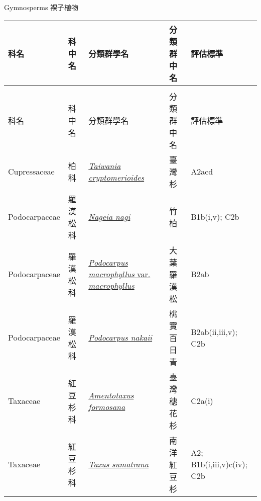 \noindent\normalfont\selectfont Gymnosperms 裸子植物
\footnotesize\selectfont
        {\def\arraystretch{1.5}\tabcolsep=2pt
        \begin{longtable}{p{2.5cm}p{2.5cm}p{4.5cm}p{2.5cm}p{3cm}}
        \toprule
          科名 & 科中名 & 分類群學名 & 分類群中名 & 評估標準 \\
        \midrule 
        \endfirsthead

        \multicolumn{4}{l}{\bfseries\Large\color{red}{國家瀕危 (NEN) 類別維管束植物名錄(續)}} \\
        \toprule
        科名 & 科中名 & 分類群學名 & 分類群中名 & 評估標準 \\
        \midrule
        \endhead
                Cupressaceae & 柏科 & \href{http://www.theplantlist.org/tpl1.1/search?q=Taiwania+cryptomerioides}{\textit{Taiwania cryptomerioides} } & 臺灣杉 & A2acd \index{Taiwania@\textit{Taiwania}!cryptomerioides@\textit{cryptomerioides}}  \index{臺灣杉} \\
    Podocarpaceae & 羅漢松科 & \href{http://www.theplantlist.org/tpl1.1/search?q=Nageia+nagi}{\textit{Nageia nagi} } & 竹柏 & B1b(i,v); C2b \index{Nageia@\textit{Nageia}!nagi@\textit{nagi}}  \index{竹柏} \\
    Podocarpaceae & 羅漢松科 & \href{http://www.theplantlist.org/tpl1.1/search?q=Podocarpus+macrophyllus+var.+macrophyllus}{\textit{Podocarpus macrophyllus} var. \textit{macrophyllus} } & 大葉羅漢松 & B2ab \index{Podocarpus@\textit{Podocarpus}!macrophyllus@\textit{macrophyllus}!var. macrophyllus@var. \textit{macrophyllus}}  \index{大葉羅漢松} \\
    Podocarpaceae & 羅漢松科 & \href{http://www.theplantlist.org/tpl1.1/search?q=Podocarpus+nakaii}{\textit{Podocarpus nakaii} } & 桃實百日青 & B2ab(ii,iii,v); C2b \index{Podocarpus@\textit{Podocarpus}!nakaii@\textit{nakaii}}  \index{桃實百日青} \\
    Taxaceae & 紅豆杉科 & \href{http://www.theplantlist.org/tpl1.1/search?q=Amentotaxus+formosana}{\textit{Amentotaxus formosana} } & 臺灣穗花杉 & C2a(i) \index{Amentotaxus@\textit{Amentotaxus}!formosana@\textit{formosana}}  \index{臺灣穗花杉} \\
    Taxaceae & 紅豆杉科 & \href{http://www.theplantlist.org/tpl1.1/search?q=Taxus+sumatrana}{\textit{Taxus sumatrana} } & 南洋紅豆杉 & A2; B1b(i,iii,v)c(iv); C2b \index{Taxus@\textit{Taxus}!sumatrana@\textit{sumatrana}}  \index{南洋紅豆杉} \\
    \bottomrule
        \end{longtable}
        }
    